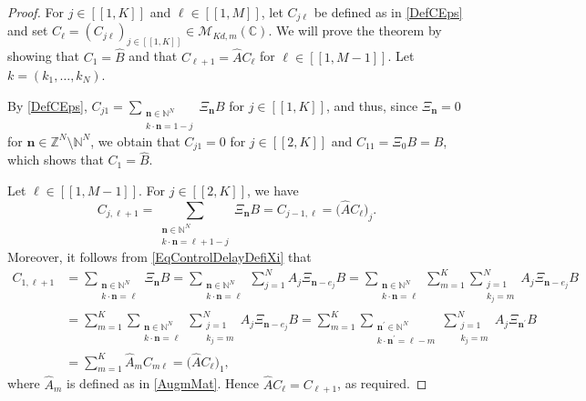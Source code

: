 \documentclass[10pt]{article}
\newcommand{\bn}{\boldsymbol{n}}
\newcommand{\llbracket}{[\![}
\newcommand{\rrbracket}{]\!]}
\theoremstyle{plain}
\theoremstyle{definition}
\numberwithin{equation}{section}\numberwithin{figure}{section}\emergencystretch=3em
\begin{document}
\begin{proof}
For $j \in \llbracket 1, K\rrbracket$ and $\ell \in \llbracket 1, M\rrbracket$, let $C_{j\ell}$ be defined as in \eqref{DefCEps} and set $C_\ell = \left(C_{j\ell}\right)_{j \in \llbracket 1, K\rrbracket} \in \mathcal M_{Kd, m}(\mathbb C)$. We will prove the theorem by showing that $C_1 = \widehat B$ and that $C_{\ell + 1} = \widehat A C_\ell$ for $\ell \in \llbracket 1, M-1\rrbracket$. Let $k = (k_1, \dots, k_N)$.

By \eqref{DefCEps}, $C_{j1} = \sum_{\substack{\bn \in \mathbb N^N \\ k \cdot \bn = 1 - j}} \Xi_{\bn} B$ for $j \in \llbracket 1, K\rrbracket$, and thus, since $\Xi_{\bn} = 0$ for $\bn \in \mathbb Z^N \setminus \mathbb N^N$, we obtain that $C_{j1} = 0$ for $j \in \llbracket 2, K\rrbracket$ and $C_{11} = \Xi_{0} B = B$, which shows that $C_1 = \widehat B$.

Let $\ell \in \llbracket 1, M-1\rrbracket$. For $j \in \llbracket 2, K\rrbracket$, we have
\[
C_{j, \ell + 1} = \sum_{\substack{\bn \in \mathbb N^N \\ k \cdot \bn = \ell + 1 - j}} \Xi_{\bn} B = C_{j-1, \ell} =\bigl(\widehat A C_{\ell}\bigr)_j.
\]
Moreover, it follows from \eqref{EqControlDelayDefiXi} that
\begin{align*}
C_{1, \ell + 1} & = \sum_{\substack{\bn \in \mathbb N^N \\ k \cdot \bn = \ell}} \Xi_{\bn} B = \sum_{\substack{\bn \in \mathbb N^N \\ k \cdot \bn = \ell}} \sum_{j=1}^N A_j \Xi_{\bn - e_j} B {} = \sum_{\substack{\bn \in \mathbb N^N \\ k \cdot \bn = \ell}} \sum_{m=1}^K \sum_{\substack{j=1 \\ k_j = m}}^N A_j \Xi_{\bn - e_j} B  \\
& = \sum_{m=1}^K \sum_{\substack{\bn \in \mathbb N^N \\ k \cdot \bn = \ell}} \sum_{\substack{j=1 \\ k_j = m}}^N A_j \Xi_{\bn - e_j} B = \sum_{m=1}^K \sum_{\substack{\bn^\prime \in \mathbb N^N \\ k \cdot \bn^\prime = \ell - m}} \sum_{\substack{j=1 \\ k_j = m}}^N A_j \Xi_{\bn^\prime} B\\& = \sum_{m=1}^K \widehat A_m C_{m\ell} = \bigl(\widehat A C_{\ell}\bigr)_1,
\end{align*}
where $\widehat A_m$ is defined as in \eqref{AugmMat}. Hence $\widehat A C_\ell = C_{\ell + 1}$, as required.
\end{proof}
\end{document}
